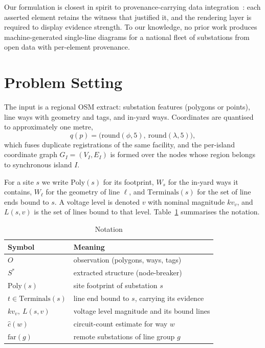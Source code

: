 \documentclass[journal]{IEEEtran}
\begin{document}
Our formulation is closest in spirit to provenance-carrying data
integration~\cite{buneman2001}:
each asserted element retains the witness that justified it, and the rendering
layer is required to display evidence strength. To our knowledge, no prior work
produces machine-generated single-line diagrams for a national fleet of
substations from open data with per-element provenance.

\section{Problem Setting}\label{sec:problem}

The input is a regional OSM extract: substation features (polygons or points),
line ways with geometry and tags, and in-yard ways. Coordinates are quantised to
approximately one metre,
\begin{equation}
q(p) = \bigl(\mathrm{round}(\phi,5),\ \mathrm{round}(\lambda,5)\bigr),
\end{equation}
which fuses duplicate registrations of the same facility, and the per-island
coordinate graph $G_I=(V_I,E_I)$ is formed over the nodes whose region belongs to
synchronous island $I$.

For a site $s$ we write $\mathrm{Poly}(s)$ for its footprint, $W_s$ for the
in-yard ways it contains, $W_\ell$ for the geometry of line $\ell$, and
$\mathrm{Terminals}(s)$ for the set of line ends bound to $s$. A voltage level is
denoted $v$ with nominal magnitude $kv_v$, and $L(s,v)$ is the set of lines bound
to that level. Table~\ref{tab:notation} summarises the notation.

\begin{table}[t]
\caption{Notation}
\label{tab:notation}
\centering
\begin{tabular}{ll}
\toprule
Symbol & Meaning \\
\midrule
$O$ & observation (polygons, ways, tags) \\
$S^{*}$ & extracted structure (node-breaker) \\
$\mathrm{Poly}(s)$ & site footprint of substation $s$ \\
$t\in\mathrm{Terminals}(s)$ & line end bound to $s$, carrying its evidence \\
$kv_v,\ L(s,v)$ & voltage level magnitude and its bound lines \\
$\hat{c}(w)$ & circuit-count estimate for way $w$ \\
$\mathrm{far}(g)$ & remote substations of line group $g$ \\
\bottomrule
\end{tabular}
\end{table}
\end{document}

